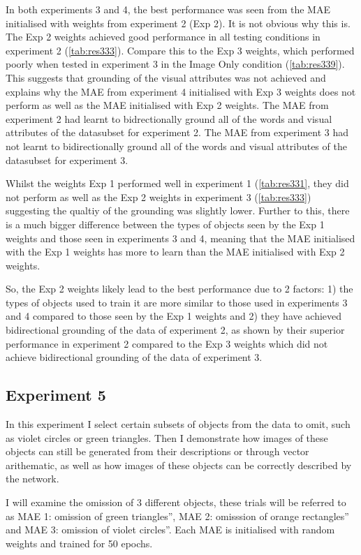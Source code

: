 In both experiments 3 and 4, the best performance was seen from the MAE initialised with weights from experiment 2 (Exp 2). It is not obvious why this is. The Exp 2 weights achieved good performance in all testing conditions in experiment 2 (\autoref{tab:res333}). Compare this to the Exp 3 weights, which performed poorly when tested in experiment 3 in the Image Only condition (\autoref{tab:res339}). This suggests that grounding of the visual attributes was not achieved and explains why the \ac{MAE} from experiment 4 initialised with Exp 3 weights does not perform as well as the \ac{MAE} initialised with Exp 2 weights. The \ac{MAE} from experiment 2 had learnt to bidrectionally ground all of the words and visual attributes of the datasubset for experiment 2. The \ac{MAE} from experiment 3 had not learnt to bidirectionally ground all of the words and visual attributes of the datasubset for experiment 3.

Whilst the weights Exp 1 performed well in experiment 1 (\autoref{tab:res331}, they did not perform as well as the Exp 2 weights in experiment 3 (\autoref{tab:res333}) suggesting the qualtiy of the grounding was slightly lower. Further to this, there is a much bigger difference between the types of objects seen by the Exp 1 weights and those seen in experiments 3 and 4, meaning that the \ac{MAE} initialised with the Exp 1 weights has more to learn than the \ac{MAE} initialised with Exp 2 weights.

So, the Exp 2 weights likely lead to the best performance due to 2 factors: 1) the types of objects used to train it are more similar to those used in experiments 3 and 4 compared to those seen by the Exp 1 weights and 2) they have achieved bidirectional grounding of the data of experiment 2, as shown by their superior performance in experiment 2 compared to the Exp 3 weights which did not achieve bidirectional grounding of the data of experiment 3.


\subsection{Experiment 5}
In this experiment I select certain subsets of objects from the data to omit, such as violet circles or green triangles. Then I demonstrate how images of these objects can still be generated from their descriptions or through vector arithematic, as well as how images of these objects can be correctly described by the network.

I will examine the omission of 3 different objects, these trials will be referred to as MAE 1: omission of green triangles'', MAE 2: omisssion of orange rectangles'' and MAE 3: omission of  violet circles''. Each MAE is initialised with random weights and trained for 50 epochs.

